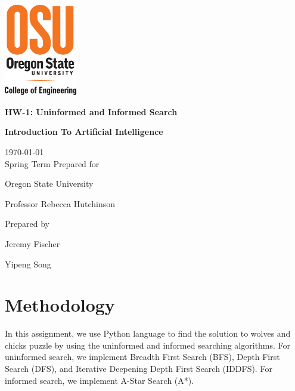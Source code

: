 \documentclass[onecolumn,draftclsnofoot, 10pt, compsoc]{IEEEtran}
\def \GroupNumber{		17}
\def \Jeremy{			Jeremy Fischer}
\def \Roger{			Yipeng Song}
\def \Class{		Introduction To Artificial Intelligence}
\def \Assn{		HW-1: Uninformed and Informed Search}
\def \School{	Oregon State University}
\def \Professor{		Professor Rebecca Hutchinson}
\begin{document}
\begin{titlepage}
    \begin{singlespace}
    	\includegraphics[height=4cm]{coe.eps}
        \hfill  
        \par\vspace{.2in}
        \centering
        \scshape{
            \vspace{.5in}
            \textbf{\Large\Assn}\par
            \textbf{\large\Class}\par
            \large{
            	\today \\Spring Term
        	}
            \vfill
            {\large Prepared for}\par
            \huge \School\par
            \vspace{5pt}
            {\Large{\Professor}\par}
            {\large Prepared by }\par
            \vspace{5pt}
            {\Large
                {\Jeremy}\par
                {\Roger}\par
            }
            \vspace{20pt}
        }

    \end{singlespace}
\end{titlepage}
\newpage
{}

\tableofcontents
\newpage
\clearpage


	\section{Methodology}	
	
    In this assignment, we use Python language to find the solution to wolves and chicks puzzle by using the uninformed and informed searching algorithms. For uninformed search, we implement Breadth First Search (BFS), Depth First Search (DFS), and Iterative Deepening Depth First Search (IDDFS). For informed search, we implement A-Star Search (A*). 
    
\end{document}
